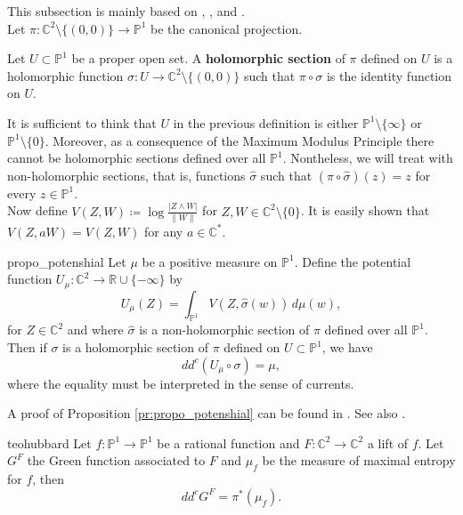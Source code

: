 This subsection is mainly based on \cite{demarco}, \cite{hubbard}, \cite{bott} and \cite{berteloot}.\\

Let $\pi:\mathbb{C}^2\setminus\{(0,0)\} \rightarrow \mathbb{P}^1$ be the canonical projection.
\begin{mydef}{}{}
Let $U\subset \mathbb{P}^1$ be a proper open set. A {\bf holomorphic section} of $\pi$ defined on $U$ is a holomorphic function $\sigma:U \rightarrow \mathbb{C}^2\setminus\{(0,0)\}$ such that $\pi \circ \sigma$ is the identity function on $U$.
\end{mydef}

It is sufficient to think that $U$ in the previous definition is either $\mathbb{P}^1\setminus \{\infty\}$ or $\mathbb{P}^1\setminus\{0\}$. Moreover, as a consequence of the Maximum Modulus Principle there cannot be holomorphic sections defined over all $\mathbb{P}^1$. Nontheless, we will treat with non-holomorphic sections, that is, functions $\widehat{\sigma}$ such that $(\pi \circ \widehat{\sigma})(z)=z$ for every $z\in \mathbb{P}^1$.\\

Now define $V(Z,W) \coloneqq  \log \frac{|Z\wedge W|}{\|W\|}$ for $Z,W \in \mathbb{C}^2\setminus\{0\}$. It is easily shown that $V(Z,aW) = V(Z,W)$ for any $a\in \mathbb{C}^*$.\\

\begin{myprop}{}{propo_potenshial}
Let $\mu$ be a positive measure on $\mathbb{P}^1$. Define the potential function $U_\mu:\mathbb{C}^2\rightarrow \mathbb{R}\cup\{-\infty\}$ by
$$U_\mu(Z) = \int_{\mathbb{P}^1} V(Z,\widehat{\sigma}(w)) \, d\mu(w),$$
for $Z\in \mathbb{C}^2$ and where $\widehat{\sigma}$ is a non-holomorphic section of $\pi$ defined over all $\mathbb{P}^1$.
Then if $\sigma$ is a holomorphic section of $\pi$ defined on $U\subset \mathbb{P}^1$, we have 
$$dd^c (U_\mu\circ \sigma) = \mu,$$
where the equality must be interpreted in the sense of currents.
\end{myprop}

A proof of Proposition \ref{pr:propo_potenshial} can be found in \cite[Theorem VII.9]{berteloot}. See also \cite[Theorem 3.7.4]{ransford}.\\

\begin{mytheo}{}{teohubbard}
Let $f:\mathbb{P}^1 \rightarrow \mathbb{P}^1$ be a rational function and $F:\mathbb{C}^2 \rightarrow \mathbb{C}^2$ a lift of $f$. Let $G^F$ the Green function associated to $F$ and $\mu_f$ be the measure of maximal entropy for $f$, then
$$dd^c G^F = \pi^*(\mu_f).$$
\end{mytheo}

